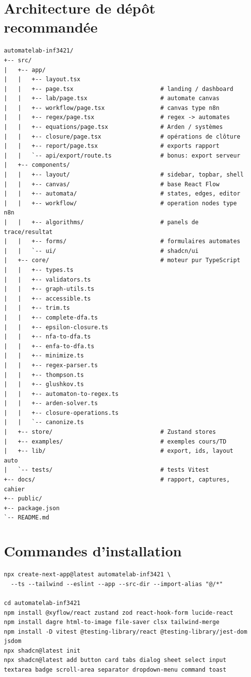 \documentclass[11pt,a4paper]{report}
\begin{document}
\section{Architecture de dépôt recommandée}
\begin{lstlisting}
automatelab-inf3421/
+-- src/
|   +-- app/
|   |   +-- layout.tsx
|   |   +-- page.tsx                         # landing / dashboard
|   |   +-- lab/page.tsx                     # automate canvas
|   |   +-- workflow/page.tsx                # canvas type n8n
|   |   +-- regex/page.tsx                   # regex -> automates
|   |   +-- equations/page.tsx               # Arden / systèmes
|   |   +-- closure/page.tsx                 # opérations de clôture
|   |   +-- report/page.tsx                  # exports rapport
|   |   `-- api/export/route.ts              # bonus: export serveur
|   +-- components/
|   |   +-- layout/                          # sidebar, topbar, shell
|   |   +-- canvas/                          # base React Flow
|   |   +-- automata/                        # states, edges, editor
|   |   +-- workflow/                        # operation nodes type n8n
|   |   +-- algorithms/                      # panels de trace/resultat
|   |   +-- forms/                           # formulaires automates
|   |   `-- ui/                              # shadcn/ui
|   +-- core/                                # moteur pur TypeScript
|   |   +-- types.ts
|   |   +-- validators.ts
|   |   +-- graph-utils.ts
|   |   +-- accessible.ts
|   |   +-- trim.ts
|   |   +-- complete-dfa.ts
|   |   +-- epsilon-closure.ts
|   |   +-- nfa-to-dfa.ts
|   |   +-- enfa-to-dfa.ts
|   |   +-- minimize.ts
|   |   +-- regex-parser.ts
|   |   +-- thompson.ts
|   |   +-- glushkov.ts
|   |   +-- automaton-to-regex.ts
|   |   +-- arden-solver.ts
|   |   +-- closure-operations.ts
|   |   `-- canonize.ts
|   +-- store/                               # Zustand stores
|   +-- examples/                            # exemples cours/TD
|   +-- lib/                                 # export, ids, layout auto
|   `-- tests/                               # tests Vitest
+-- docs/                                    # rapport, captures, cahier
+-- public/
+-- package.json
`-- README.md
\end{lstlisting}

\section{Commandes d'installation}
\begin{lstlisting}
npx create-next-app@latest automatelab-inf3421 \
  --ts --tailwind --eslint --app --src-dir --import-alias "@/*"

cd automatelab-inf3421
npm install @xyflow/react zustand zod react-hook-form lucide-react
npm install dagre html-to-image file-saver clsx tailwind-merge
npm install -D vitest @testing-library/react @testing-library/jest-dom jsdom
npx shadcn@latest init
npx shadcn@latest add button card tabs dialog sheet select input textarea badge scroll-area separator dropdown-menu command toast
\end{lstlisting}
\end{document}
